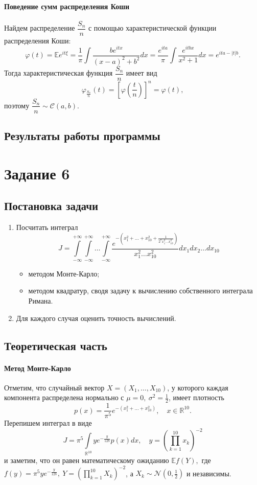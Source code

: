 \documentclass[16pt]{article}
\newcommand\Real{\mathbb{R}}
\begin{document}
\paragraph{Поведение сумм распределения Коши}
Найдем распределение $\dfrac{S_n}{n}$ с помощью характеристической функции распределения Коши:
$$\varphi(t) = \mathbb{E}e^{it\xi} = \frac1\pi\int\frac{be^{itx}}{(x - a)^2 + b^2}dx = \frac{e^{ita}}{\pi}\int\frac{e^{itbx}}{x^2 + 1}dx = e^{ita - |t|b}.$$
Тогда характеристическая функция $\dfrac{S_n}{n}$ имеет вид
$$\varphi_{\frac{S_n}{n}}(t) = \left[\varphi\left(\frac{t}{n}\right)\right]^n = \varphi(t),$$
поэтому $\dfrac{S_n}{n} \sim \mathcal{C}(a, b)$.

\subsection{Результаты работы программы}

\section{Задание 6}
\subsection{Постановка задачи}
\begin{enumerate}
\item Посчитать интеграл
$$J = \int\limits_{-\infty}^{+\infty}\int\limits_{-\infty}^{+\infty}\ldots\int\limits_{-\infty}^{+\infty} \dfrac{e^{-\left(x_1^2 + \ldots + x_{10}^2 + \frac{1}{2^7x_1^2\ldots x_{10}^2}\right)}}{x_1^2\ldots x_{10}^2}dx_1dx_2\ldots dx_{10}$$
\begin{itemize}
	\item методом Монте-Карло;
	\item методом квадратур, сводя задачу к вычислению собственного интеграла Римана.
\end{itemize} 
\item Для каждого случая оценить точность вычислений.
\end{enumerate}

\subsection{Теоретическая часть}
\paragraph{Метод Монте-Карло} Отметим, что случайный вектор $X = (X_1, \ldots, X_{10})$, у которого каждая компонента распределена нормально с $\mu = 0,\ \sigma^2 = \frac12$, имеет плотность
$$p(x) = \frac{1}{\pi^5}e^{-(x_1^2 + \ldots + x_{10}^2)}, \quad x \in \Real^{10}.$$
Перепишем интеграл в виде
$$ J = \pi^5 \int\limits_{\mathbb{R}^{10}} ye^{-\frac{y}{128}}p(x)dx, \quad y = \left(\prod_{k=1}^{10} x_k\right)^{-2}$$
и заметим, что он равен математическому ожиданию
$\mathbb{E}f(Y),$
где $f(y) = \pi^5 y e^{-\frac{y}{128}},\ Y = \left(\prod_{k=1}^{10} X_k\right)^{-2}$, а $X_k \sim \mathcal{N}\left(0, \frac12\right)$ и независимы.
\end{document}
